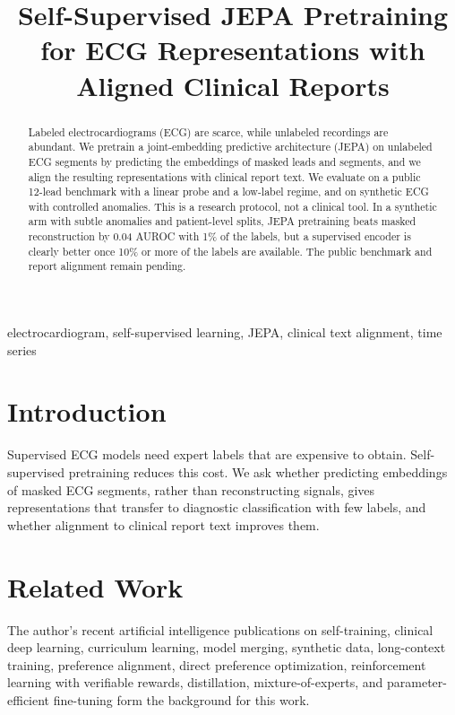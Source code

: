 \documentclass[conference]{IEEEtran}
\begin{document}
\title{Self-Supervised JEPA Pretraining for ECG Representations with Aligned Clinical Reports}

\author{
}

\maketitle

\begin{abstract}
Labeled electrocardiograms (ECG) are scarce, while unlabeled recordings are abundant. We pretrain a joint-embedding predictive architecture (JEPA) on unlabeled ECG segments by predicting the embeddings of masked leads and segments, and we align the resulting representations with clinical report text. We evaluate on a public 12-lead benchmark with a linear probe and a low-label regime, and on synthetic ECG with controlled anomalies. This is a research protocol, not a clinical tool. In a synthetic arm with subtle anomalies and patient-level splits, JEPA pretraining beats masked reconstruction by 0.04 AUROC with 1\% of the labels, but a supervised encoder is clearly better once 10\% or more of the labels are available. The public benchmark and report alignment remain pending.
\end{abstract}

\begin{IEEEkeywords}
electrocardiogram, self-supervised learning, JEPA, clinical text alignment, time series
\end{IEEEkeywords}

\section{Introduction}
Supervised ECG models need expert labels that are expensive to obtain. Self-supervised pretraining reduces this cost. We ask whether predicting embeddings of masked ECG segments, rather than reconstructing signals, gives representations that transfer to diagnostic classification with few labels, and whether alignment to clinical report text improves them.

\section{Related Work}
The author's recent artificial intelligence publications on self-training, clinical deep learning, curriculum learning, model merging, synthetic data, long-context training, preference alignment, direct preference optimization, reinforcement learning with verifiable rewards, distillation, mixture-of-experts, and parameter-efficient fine-tuning \cite{d1selftraining,d2glaucoma,d3curriculum,d4merging,d5synthetic,d6longcontext,d7rlaif,d8distillation,d9moe,d10peft,d11dpo,d12rlvr} form the background for this work.
\end{document}

